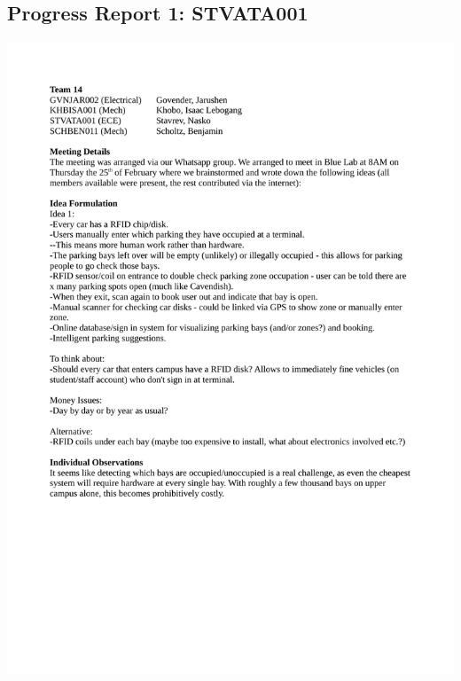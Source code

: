 \subsection*{Progress Report 1: STVATA001}
\includegraphics[scale=0.9]{meeting/report1-nasko.pdf}

\newpage
